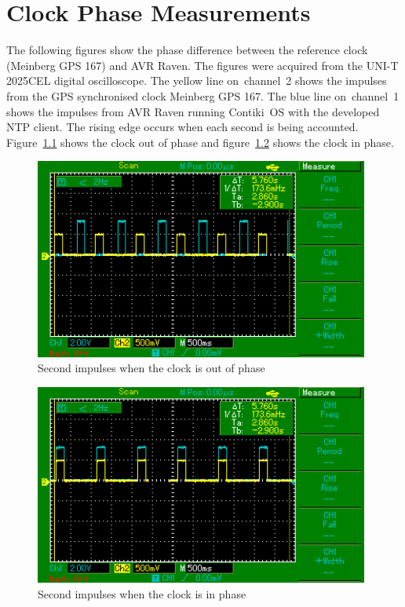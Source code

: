 \chapter{Clock Phase Measurements}\label{app:phase}
The following figures show the phase difference between
the reference clock (Meinberg GPS 167) and AVR Raven.
The figures were acquired from the UNI-T 2025CEL digital oscilloscope.
The yellow line on~channel~2 shows the impulses from the GPS synchronised clock Meinberg GPS 167.
The blue line on~channel~1 shows the impulses from AVR Raven running
Contiki~OS with the developed NTP client.
The rising edge occurs when each second is being accounted.
Figure~\ref{fig:app-osc-out-of-phase} shows the clock out of phase
and figure~\ref{fig:app-osc-in-phase} shows the clock in phase.
\begin{figure}[ht]
  \centering
  \includegraphics[width=11cm,keepaspectratio]{fig/osc-out-of-phase.png}
  \caption{Second impulses when the clock is out of phase}
  \label{fig:app-osc-out-of-phase}
  \bigskip
\end{figure}

\begin{figure}
  \centering
  \includegraphics[width=11cm,keepaspectratio]{fig/osc-in-phase.png}
  \caption{Second impulses when the clock is in phase}
  \label{fig:app-osc-in-phase}
  \bigskip
\end{figure}


